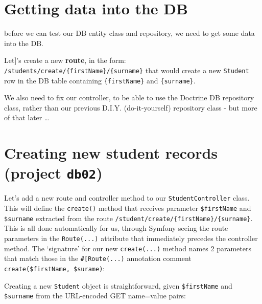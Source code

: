 \documentclass[a4paperpaper,openright]{book}
\newenvironment{Shaded}{}{}
\newcommand{\CommentTok}[1]{\textcolor[rgb]{0.38,0.63,0.69}{\textit{#1}}}
\newcommand{\KeywordTok}[1]{\textcolor[rgb]{0.00,0.44,0.13}{\textbf{#1}}}
\newcommand{\NormalTok}[1]{#1}
\newcommand{\OtherTok}[1]{\textcolor[rgb]{0.00,0.44,0.13}{#1}}
\begin{document}
\hypertarget{getting-data-into-the-db}{%
\section{Getting data into the DB}\label{getting-data-into-the-db}}

before we can test our DB entity class and repository, we need to get
some data into the DB.

Let{]}'s create a new \textbf{route}, in the form:
\texttt{/students/create/\{firstName\}/\{surname\}} that would create a
new \texttt{Student} row in the DB table containing
\texttt{\{firstName\}} and \texttt{\{surname\}}.

We also need to fix our controller, to be able to use the Doctrine DB
repository class, rather than our previous D.I.Y. (do-it-yourself)
repository class - but more of that later \ldots{}

\hypertarget{creating-new-student-records-project-db02}{%
\section{\texorpdfstring{Creating new student records (project
\texttt{db02})}{Creating new student records (project db02)}}\label{creating-new-student-records-project-db02}}

Let's add a new route and controller method to our
\texttt{StudentController} class. This will define the \texttt{create()}
method that receives parameter \texttt{\$firstName} and
\texttt{\$surname} extracted from the route
\texttt{/student/create/\{firstName\}/\{surname\}}. This is all done
automatically for us, through Symfony seeing the route parameters in the
\texttt{Route(...)} attribute that immediately precedes the controller
method. The `signature' for our new \texttt{create(...)} method names 2
parameters that match those in the \texttt{\#{[}Route(...)} annotation
comment \texttt{create(\$firstName,\ \$surame)}:

\begin{Shaded}
\end{Shaded}

Creating a new \texttt{Student} object is straightforward, given
\texttt{\$firstName} and \texttt{\$surname} from the URL-encoded GET
name=value pairs:
\end{document}
